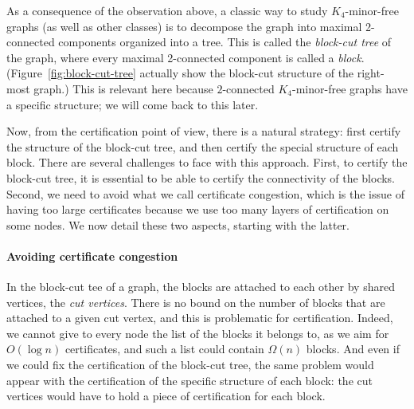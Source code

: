 \documentclass[a4paper,thm-restate,USenglish]{lipics-v2019}
\begin{document}
As a consequence of the observation above, a classic way to study $K_4$-minor-free graphs (as well as other classes) is to decompose the graph into maximal 2-connected components organized into a tree. 
This is called the \emph{block-cut tree} of the graph, where every maximal 2-connected component is called a \emph{block}. (Figure~\ref{fig:block-cut-tree} actually show the block-cut structure of the right-most graph.)
This is relevant here because $2$-connected $K_4$-minor-free graphs have a specific structure; we will come back to this later.

Now, from the certification point of view, there is a natural strategy: first certify the structure of the block-cut tree, and then certify the special structure of each block. There are several challenges to face with this approach. First, to certify the block-cut tree, it is essential to be able to certify the connectivity of the blocks. 
Second, we need to avoid what we call certificate congestion, which is the issue of having too large certificates because we use too many layers of certification on some nodes. We now detail these two aspects, starting with the latter.

\paragraph*{Avoiding certificate congestion}
In the block-cut tee of a graph, the blocks are attached to each other by shared vertices, the \emph{cut vertices}. There is no bound on the number of blocks that are attached to a given cut vertex, and this is problematic for certification. 
Indeed, we cannot give to every node the list of the blocks it belongs to, as we aim for $O(\log n)$ certificates, and such a list could contain $\Omega(n)$ blocks. 
And even if we could fix the certification of the block-cut tree, the same problem would appear with the certification of the specific structure of each block: the cut vertices would have to hold a piece of certification for each block. 
\end{document}
